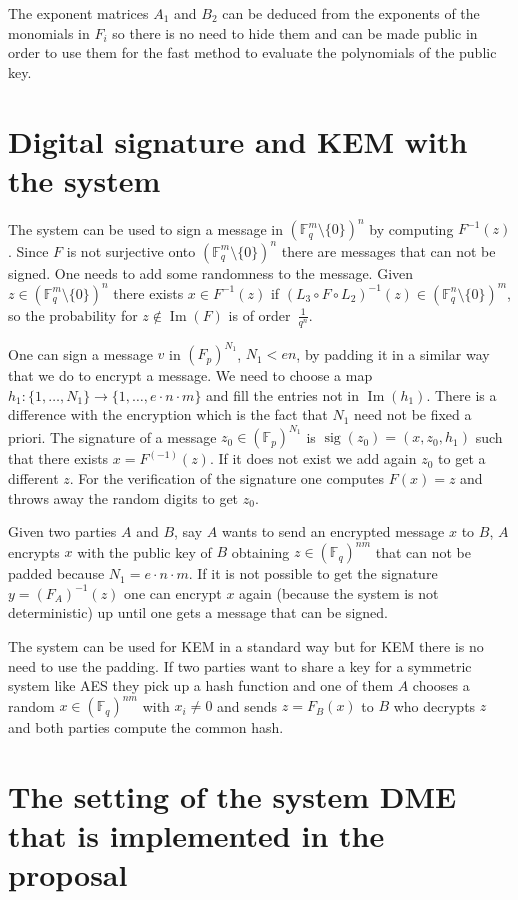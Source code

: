 \documentclass[12pt,a4paper]{amsart}
\theoremstyle{remark}
\theoremstyle{definition}
\begin{document}
The exponent matrices $A_1$ and $B_2$ can be deduced from the exponents of the monomials in $F_i$ so 
there is no need to hide them and can be made public in order to use them for the fast method to 
evaluate the polynomials of the public key.

\section*{Digital signature and KEM with the system}
The system can be used to sign a message in $(\mathbb{F}_q^m\setminus\{0\})^n$ by computing $F^{-1}(z)$. 
Since $F$ is not surjective onto $(\mathbb{F}_q^m\setminus\{0\})^n$ there are messages that can not be signed. 
One needs to add some randomness to the message.
Given $z\in(\mathbb{F}_q^m\setminus\{0\})^n$ there exists $x\in F^{-1}(z)$
if $(L_3\circ F\circ L_2)^{-1}(z)\in(\mathbb{F}_q^n\setminus\{0\})^m$, so the probability
for $z\notin\operatorname{Im}(F)$ is of order~$\frac{1}{q^n}$.

One can sign a message $v$ in $(F_p)^{N_1}$, $N_1<e n$, by padding it in a similar way that we do to encrypt a message.
We need to choose a map $h_1:\{1,\dots,N_1\} \to  \{1,\dots,e\cdot n\cdot m\}$ and fill the entries not in 
$\operatorname{Im}(h_1)$. There is a difference with the encryption which is the fact that $N_1$ need not be fixed a priori. 
The signature of a message $z_0\in (\mathbb{F}_p)^{N_1}$ is 
$\operatorname{sig}(z_0)=(x,z_0,h_1)$ such that there exists $x=F^(-1)(z)$. 
If it does not exist we add again $z_0$ to get a different $z$.
For the verification of the signature one computes $F(x)=z$ and throws away the random digits to get $z_0$.

Given two parties $A$ and $B$, say $A$ wants to send an encrypted message $x$ to $B$, 
$A$ encrypts $x$ with the public key of $B$ obtaining $z \in (\mathbb{F}_q)^{nm}$ that can not be padded because 
$N_1=e\cdot n\cdot m$. If it is not possible to get the signature $y=(F_A)^{-1}(z)$ one can encrypt $x$ again 
(because the system is not deterministic) up until one gets a message that can be signed.

The system can be used for KEM in a standard way but for KEM there is no need to use the padding. 
If two parties want to share a key for a symmetric system like AES they pick up a hash function and 
one of them $A$ chooses a random $x \in (\mathbb{F}_q)^{nm}$ with $x_i \neq 0$ 
and sends $z=F_B(x)$ to $B$ who decrypts $z$ and both parties compute the common hash.

\section*{The setting of the system DME that is implemented in the proposal}
\end{document}
